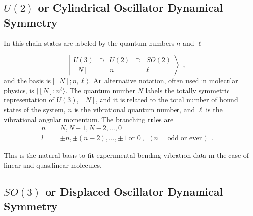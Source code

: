 \documentclass[a4paper,12pt,captions=tableheading]{article}
\begin{document}
\subsection{\(U(2)\) or Cylindrical Oscillator Dynamical Symmetry}
\label{sec-2-1}

In this chain states are labeled by the quantum numbers \(n\) and \(\ell\)

\begin{equation}
\left|\begin{array}{ccccc}
U(3)&\supset& U(2)&\supset& SO(2)\\
\left[N\right]   &       & n   &       & \ell
\end{array}\right\rangle ~~,
\label{cobas}
\end{equation}
\noindent and the basis is \(|[N];n,\ell\rangle\). An alternative notation,
often used in molecular physics, is \(|[N];n^\ell\rangle\). The quantum number $N$ 
labels the totally symmetric representation of $U(3)$, $[N]$, and it is
related to the total number of bound states of the system, $n$ is the
vibrational quantum number, and $\ell$ is the vibrational angular momentum. The
branching rules are 
\begin{align}
n & =  N, N-1, N-2, \ldots, 0 \nonumber\\
l & =  \pm n, \pm (n-2), \ldots, \pm 1 \mbox{ or }0~,~~ (n = \mbox{odd or
  even}) ~~.
\end{align}

This is the natural basis to fit experimental bending vibration data
in the case of linear and quasilinear molecules.

\subsection{\(SO(3)\) or Displaced Oscillator Dynamical Symmetry}
\label{sec-2-2}
\end{document}
